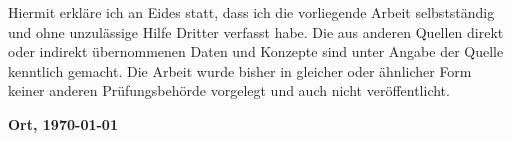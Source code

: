 \newpage

Hiermit erkläre ich an Eides statt, dass ich die vorliegende Arbeit selbstständig und ohne unzulässige Hilfe Dritter verfasst habe. Die aus anderen Quellen direkt oder indirekt übernommenen Daten und Konzepte sind unter Angabe der Quelle kenntlich gemacht. Die Arbeit wurde bisher in gleicher oder ähnlicher Form keiner anderen Prüfungsbehörde vorgelegt und auch nicht veröffentlicht.

\vspace{2cm}

\textbf{Ort, \today}

\vspace{1.5cm}
